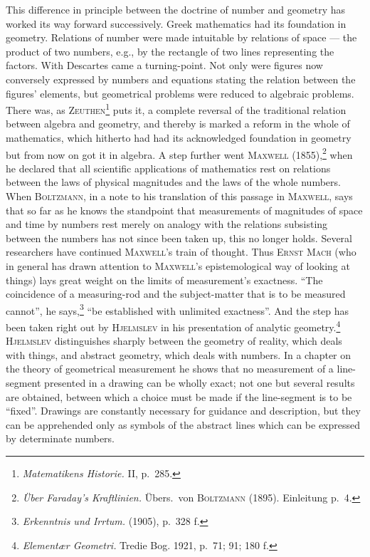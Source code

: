 \documentclass[12pt]{book}
\newcommand{\opage}[1]{\marginnote{\footnotesize\textit{[#1]}}}
\begin{document}
This difference in principle between the doctrine of number and geometry has
worked its way forward successively. Greek mathematics had its foundation in
geometry. Relations of number were made intuitable by relations of space --- the
product of two numbers, e.g., by the rectangle of two lines representing the
factors. With Descartes came a turning-point. Not only were \opage{87}figures now
conversely expressed by numbers and equations stating the relation between the
figures' elements, but geometrical problems were reduced to algebraic problems.
There was, as \textsc{Zeuthen}\footnote{\textit{Matematikens Historie.} II, p.\
285.} puts it, a complete reversal of the traditional relation between algebra
and geometry, and thereby is marked a reform in the whole of mathematics, which
hitherto had had its acknowledged foundation in geometry but from now on got it in
algebra. A step further went \textsc{Maxwell} (1855),\footnote{\textit{Über
Faraday's Kraftlinien.} Übers.\ von \textsc{Boltzmann} (1895). Einleitung p.\ 4.}
when he declared that all scientific applications of mathematics rest on relations
between the laws of physical magnitudes and the laws of the whole numbers. When
\textsc{Boltzmann}, in a note to his translation of this passage in
\textsc{Maxwell}, says that so far as he knows the standpoint that measurements of
magnitudes of space and time by numbers rest merely on analogy with the relations
subsisting between the numbers has not since been taken up, this no longer holds.
Several researchers have continued \textsc{Maxwell}'s train of thought. Thus
\textsc{Ernst Mach} (who in general has drawn attention to \textsc{Maxwell}'s
epistemological way of looking at things) lays great weight on the limits of
measurement's exactness. ``The coincidence of a measuring-rod and the
subject-matter that is to be measured cannot'', he says,\footnote{\textit{Erkenntnis
und Irrtum.} (1905), p.\ 328 f.} ``be established with unlimited exactness''. And
the step has been taken right out by \textsc{Hjelmslev} in his presentation of
analytic geometry.\footnote{\textit{Elementær Geometri.} Tredie Bog. 1921, p.\ 71;
91; 180 f.} \textsc{Hjelmslev} distinguishes sharply between the geometry of
reality, which deals with things, and abstract geometry, which deals with numbers.
In a chapter on the theory of geometrical measurement he shows that no measurement
of a line-segment presented in a drawing can be wholly \opage{88}exact; not one but several
results are obtained, between which a choice must be made if the line-segment is
to be ``fixed''. Drawings are constantly necessary for guidance and description,
but they can be apprehended only as symbols of the abstract lines which can be
expressed by determinate numbers.
\end{document}
